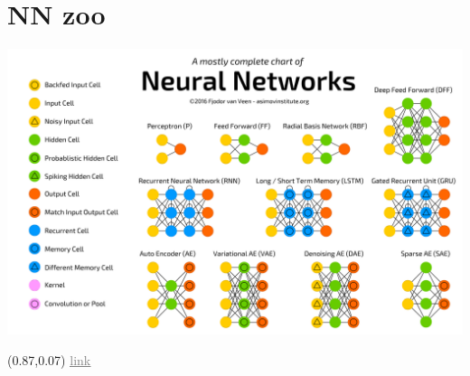 \documentclass[aspectratio=169,usenames,dvipsnames]{beamer}
\begin{document}
\section{NN zoo}


\begin{frame}[plain]
\centering
\huge

\centering
\vspace{0.1\paperheight}
\begin{tcolorbox}[colframe=white, colback=mygrey, width=0.3\paperwidth,
	arc=2.mm, boxsep=2mm,
	box align=center,
	halign=center,
	valign=center,
	]
	\insertsection
\end{tcolorbox}


\transfade[duration=.4]
\end{frame}


\begin{frame}

\centering
\includegraphics[width=0.85\linewidth]{networkZooPoster_1}

\begin{textblock*}{0.1\paperwidth}(0.87\paperwidth,0.07\paperheight)
	\footnotesize
	\href{https://www.asimovinstitute.org/neural-network-zoo/}{\textcolor{gray}{\underline{link}}}
\end{textblock*}


\end{frame}
\end{document}
